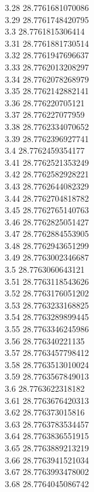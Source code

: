 {3.28	28.7761681070086\\
3.29	28.7761748420795\\
3.3	28.7761815306414\\
3.31	28.7761881730514\\
3.32	28.7761947696637\\
3.33	28.7762013208297\\
3.34	28.7762078268979\\
3.35	28.7762142882141\\
3.36	28.776220705121\\
3.37	28.776227077959\\
3.38	28.7762334070652\\
3.39	28.7762396927741\\
3.4	28.7762459354177\\
3.41	28.7762521353249\\
3.42	28.7762582928221\\
3.43	28.7762644082329\\
3.44	28.7762704818782\\
3.45	28.7762765140763\\
3.46	28.7762825051427\\
3.47	28.7762884553905\\
3.48	28.7762943651299\\
3.49	28.7763002346687\\
3.5	28.7763060643121\\
3.51	28.7763118543626\\
3.52	28.7763176051202\\
3.53	28.7763233168825\\
3.54	28.7763289899445\\
3.55	28.7763346245986\\
3.56	28.776340221135\\
3.57	28.7763457798412\\
3.58	28.7763513010024\\
3.59	28.7763567849013\\
3.6	28.7763622318182\\
3.61	28.7763676420313\\
3.62	28.776373015816\\
3.63	28.7763783534457\\
3.64	28.7763836551915\\
3.65	28.7763889213219\\
3.66	28.7763941521034\\
3.67	28.7763993478002\\
3.68	28.7764045086742\\
}
